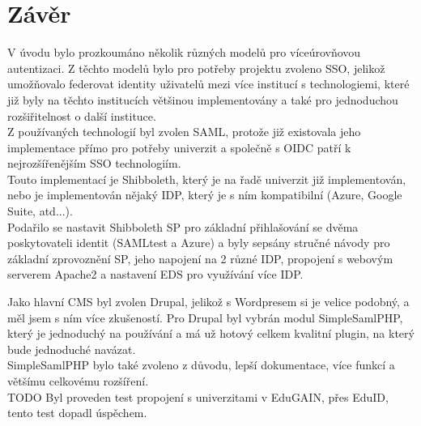    
    
        


\chapter{Závěr}


V úvodu bylo prozkoumáno několik různých modelů pro víceúrovňovou autentizaci. Z těchto modelů bylo pro potřeby projektu zvoleno SSO, jelikož umožňovalo federovat identity uživatelů mezi více institucí s technologiemi, které již byly na těchto institucích většinou implementovány a také pro jednoduchou rozšiřitelnost o další instituce.
\\
Z používaných technologií byl zvolen SAML, protože již existovala jeho implementace přímo pro potřeby univerzit a společně s OIDC patří k nejrozšířenějším SSO technologiím. \\
Touto implementací je Shibboleth, který je na řadě univerzit již implementován, nebo je implementován nějaký IDP, který je s ním kompatibilní (Azure, Google Suite, atd...).\\
Podařilo se nastavit Shibboleth SP pro základní přihlašování se dvěma poskytovateli identit (SAMLtest a Azure) a byly sepsány stručné návody pro základní zprovoznění SP, jeho napojení na 2 různé IDP, propojení s webovým serverem Apache2 a nastavení EDS pro využívání více IDP.

Jako hlavní CMS byl zvolen Drupal, jelikož s Wordpresem si je velice podobný, a měl jsem s ním více zkušeností. Pro Drupal byl vybrán modul SimpleSamlPHP, který je jednoduchý na používání a má už hotový celkem kvalitní plugin, na který bude jednoduché navázat. \\
SimpleSamlPHP bylo také zvoleno z důvodu, lepší dokumentace, více funkcí a většímu celkovému rozšíření. 
\\
TODO Byl proveden test propojení s univerzitami v EduGAIN, přes EduID, tento test dopadl úspěchem. 


\label{zaver}






